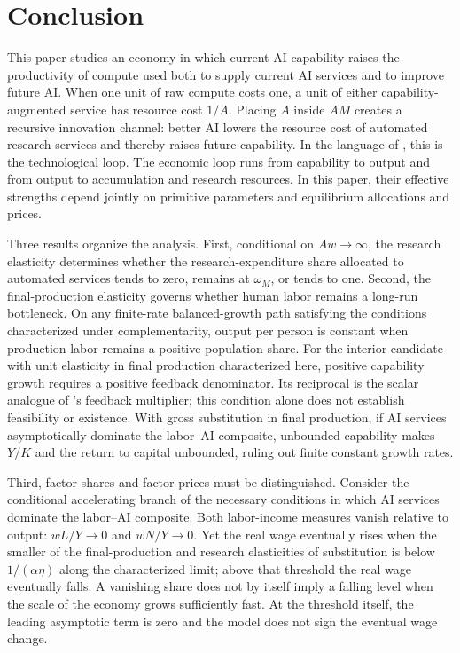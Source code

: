 \section{Conclusion}

This paper studies an economy in which current AI capability raises the
productivity of compute used both to supply current AI services and to improve
future AI. When one unit of raw compute costs one, a unit of either
capability-augmented service has resource cost \(1/A\). Placing \(A\) inside
\(AM\) creates a recursive innovation channel: better AI lowers the resource
cost of automated research services and thereby raises future capability.
In the language of \citet{davidsonetal2026}, this is the technological loop. The
economic loop runs from capability to output and from output to accumulation and
research resources. In this paper, their effective strengths depend jointly on
primitive parameters and equilibrium allocations and prices.

Three results organize the analysis. First, conditional on \(Aw\to\infty\), the
research elasticity determines whether the research-expenditure share allocated
to automated services
tends to zero, remains at \(\omega_M\), or tends to one.
Second, the final-production elasticity governs whether human labor remains a
long-run bottleneck. On any finite-rate balanced-growth path satisfying the
conditions characterized under complementarity, output per person is constant
when production labor remains a positive population share. For the interior
candidate with unit elasticity in final production characterized here, positive
capability growth requires
a positive feedback denominator. Its reciprocal is the scalar analogue of
\citet{davidsonetal2026}'s feedback multiplier; this condition alone does not establish
feasibility or existence. With gross substitution in final production, if AI services asymptotically
dominate the labor--AI composite, unbounded capability makes \(Y/K\) and the
return to capital unbounded, ruling out finite constant growth rates.

Third, factor shares and factor prices must be distinguished. Consider the
conditional accelerating branch of the necessary conditions in which AI
services dominate the labor--AI composite. Both labor-income
measures vanish relative to output: \(wL/Y\to0\) and \(wN/Y\to0\). Yet the real
wage eventually rises when the smaller of the final-production and research
elasticities of substitution is below \(1/(\alpha\eta)\) along the characterized
limit; above that threshold the real wage eventually falls. A vanishing share does not by itself imply a
falling level when the scale of the economy grows sufficiently fast.
At the threshold itself, the leading asymptotic term is zero and the model does
not sign the eventual wage change.

